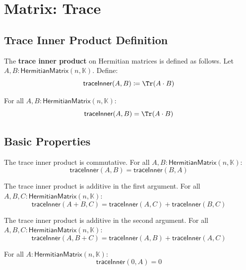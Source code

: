 \section{Matrix: Trace}

\subsection{Trace Inner Product Definition}

\begin{definition}[traceInner]
The \textbf{trace inner product} on Hermitian matrices is defined as follows. Let $A, B : \mathsf{HermitianMatrix}(n, \mathbb{K})$. Define:
\[ \mathsf{traceInner}(A, B) \defas \Tr(A \cdot B) \]
\end{definition}

\begin{lemma}
For all $A, B : \mathsf{HermitianMatrix}(n, \mathbb{K})$:
\[ \mathsf{traceInner}(A, B) = \Tr(A \cdot B) \]
\end{lemma}

\subsection{Basic Properties}

\begin{theorem}
The trace inner product is commutative. For all $A, B : \mathsf{HermitianMatrix}(n, \mathbb{K})$:
\[ \mathsf{traceInner}(A, B) = \mathsf{traceInner}(B, A) \]
\end{theorem}

\begin{theorem}
The trace inner product is additive in the first argument. For all $A, B, C : \mathsf{HermitianMatrix}(n, \mathbb{K})$:
\[ \mathsf{traceInner}(A + B, C) = \mathsf{traceInner}(A, C) + \mathsf{traceInner}(B, C) \]
\end{theorem}

\begin{theorem}
The trace inner product is additive in the second argument. For all $A, B, C : \mathsf{HermitianMatrix}(n, \mathbb{K})$:
\[ \mathsf{traceInner}(A, B + C) = \mathsf{traceInner}(A, B) + \mathsf{traceInner}(A, C) \]
\end{theorem}

\begin{theorem}
For all $A : \mathsf{HermitianMatrix}(n, \mathbb{K})$:
\[ \mathsf{traceInner}(0, A) = 0 \]
\end{theorem}

